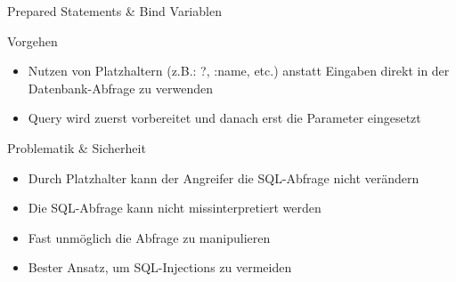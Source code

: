 \begin{frame}{Prepared Statements \& Bind Variablen}
\begin{block}{Vorgehen}
\begin{itemize}
\item Nutzen von Platzhaltern (z.B.: ?, :name, etc.) anstatt Eingaben direkt in der Datenbank-Abfrage zu verwenden
\item Query wird zuerst vorbereitet und danach erst die Parameter eingesetzt
\end{itemize}
\end{block}
\begin{block}{Problematik \& Sicherheit}
\begin{itemize}[<+->]
	\item Durch Platzhalter kann der Angreifer die SQL-Abfrage nicht verändern
	\item Die SQL-Abfrage kann nicht missinterpretiert werden
	\item Fast unmöglich die Abfrage zu manipulieren
	\item Bester Ansatz, um SQL-Injections zu vermeiden
\end{itemize}
\end{block}
\end{frame}

